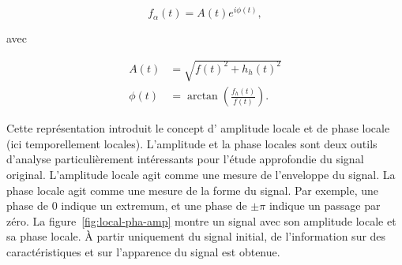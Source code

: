 \begin{equation}
    f_{\alpha} (t) = A(t)e^{i\phi(t)},
\end{equation}

\noindent avec

\begin{align}
    A(t) &= \sqrt{f(t)^2 + h_h(t)^2} \\
    \phi(t) &= \arctan\left(\frac{f_h(t)}{f(t)}\right).
\end{align}

\noindent Cette représentation introduit le concept d' amplitude locale et de phase locale (ici temporellement locales). L'amplitude et la phase locales sont deux outils d'analyse particulièrement intéressants pour l'étude approfondie du signal original. L'amplitude locale agit comme une mesure de l'enveloppe du signal. La phase locale agit comme une mesure de la forme du signal. Par exemple, une phase de $0$ indique un extremum, et une phase de $\pm\pi$ indique un passage par zéro. La figure~\ref{fig:local-pha-amp} montre un signal avec son amplitude locale et sa phase locale. À partir uniquement du signal initial, de l'information sur des caractéristiques et sur l'apparence du signal est obtenue.

